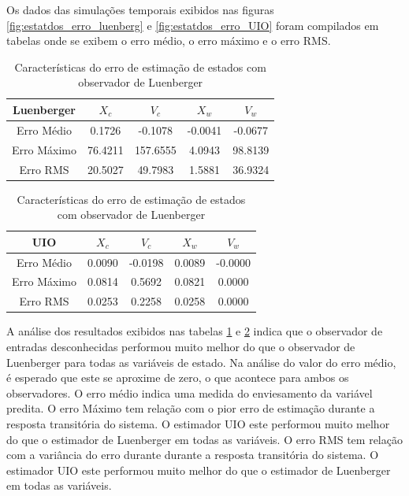 Os dados das simulações temporais exibidos nas figuras \ref{fig:estatdos_erro_luenberg} e \ref{fig:estatdos_erro_UIO} foram compilados em tabelas onde se exibem o erro médio, o erro máximo e o erro RMS.
\FloatBarrier
\begin{table}[h!]
\footnotesize
\centering
    \begin{tabular}{|c|c|c|c|c|}
        \hline
        Luenberger & $X_c$& $V_c$& $X_w$& $V_w$\\
        \hline
        \hline
         Erro Médio&  0.1726&   -0.1078&   -0.0041&   -0.0677\\ 
         Erro Máximo& 76.4211&  157.6555&    4.0943&   98.8139\\ 
         Erro RMS&    20.5027&   49.7983&    1.5881&   36.9324\\
        \hline
    \end{tabular} \label{tb:comparacao_erro_estado_LUE}\caption{Características do erro de estimação de estados com observador de Luenberger}
\end{table}

\begin{table}[h!]
\footnotesize
\centering
    \begin{tabular}{|c|c|c|c|c|}
        \hline
        UIO & $X_c$& $V_c$& $X_w$& $V_w$\\
        \hline
        \hline
         Erro Médio&  0.0090&   -0.0198&    0.0089&   -0.0000\\ 
         Erro Máximo& 0.0814&    0.5692&    0.0821&    0.0000\\ 
         Erro RMS&    0.0253&    0.2258&    0.0258&    0.0000\\
        \hline
    \end{tabular} \label{tb:comparacao_erro_estados_UIO}\caption{Características do erro de estimação de estados com observador de Luenberger}
\end{table}
\FloatBarrier

A análise dos resultados exibidos nas tabelas \ref{tb:comparacao_erro_estado_LUE} e \ref{tb:comparacao_erro_estados_UIO} indica que o observador de entradas desconhecidas performou muito melhor do que o observador de Luenberger para todas as variáveis de estado. 
Na análise do valor do erro médio, é esperado que este se aproxime de zero, o que acontece para ambos os observadores. O erro médio indica uma medida do enviesamento da variável predita.
O erro Máximo tem relação com o pior erro de estimação durante a resposta transitória do sistema. O estimador UIO este performou muito melhor do que o estimador de Luenberger em todas as variáveis.
O erro RMS tem relação com a variância do erro durante durante a resposta transitória do sistema. O estimador UIO este performou muito melhor do que o estimador de Luenberger em todas as variáveis.


